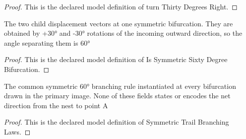 \begin{proof}
  This is the declared model definition of turn Thirty Degrees Right.
\end{proof}
\begin{definition}
  \label{def:physics:phyx-mini-0734:phyxminiproblems-problemphyxmini0734-issymmetricsixtydegreebifurcation}
  The two child displacement vectors at one symmetric bifurcation. They are obtained by +30° and -30° rotations of the incoming outward direction, so the angle separating them is 60°
\end{definition}
\begin{proof}
  This is the declared model definition of Is Symmetric Sixty Degree Bifurcation.
\end{proof}
\begin{definition}
  \label{def:physics:phyx-mini-0734:phyxminiproblems-problemphyxmini0734-symmetrictrailbranchinglaws}
  The common symmetric 60° branching rule instantiated at every bifurcation drawn in the primary image. None of these fields states or encodes the net direction from the nest to point A
\end{definition}
\begin{proof}
  This is the declared model definition of Symmetric Trail Branching Laws.
\end{proof}
